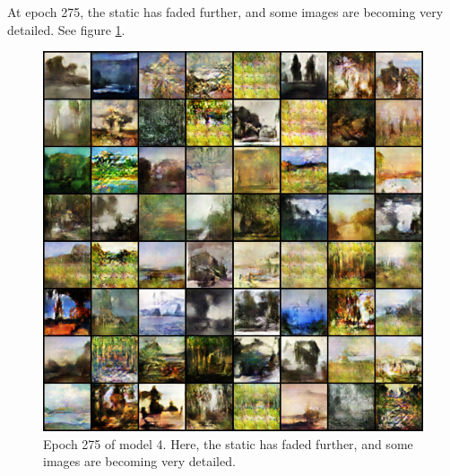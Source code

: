 \documentclass[11pt,letterpaper]{article}
\begin{document}
				At epoch 275, the static has faded further, and some images are becoming very detailed.
				See figure \ref{fig:wa64:epoch275generator}.
				\begin{figure}
					\centering
					\includegraphics[width=1.0\linewidth]{results/model4/epoch275_generator}
					\caption{Epoch 275 of model 4. Here, the static has faded further, and some images are becoming very detailed.}
					\label{fig:wa64:epoch275generator}
				\end{figure}
\end{document}
